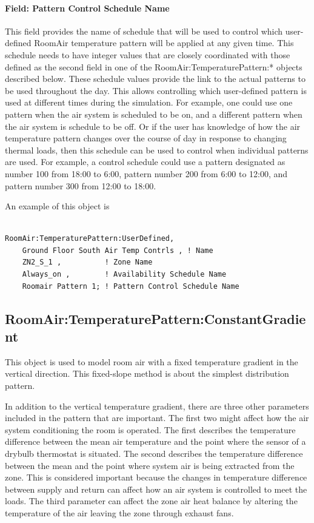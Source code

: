 \paragraph{Field: Pattern Control Schedule Name}\label{field-pattern-control-schedule-name}

This field provides the name of schedule that will be used to control which user-defined RoomAir temperature pattern will be applied at any given time. This schedule needs to have integer values that are closely coordinated with those defined as the second field in one of the RoomAir:TemperaturePattern:* objects described below. These schedule values provide the link to the actual patterns to be used throughout the day. This allows controlling which user-defined pattern is used at different times during the simulation. For example, one could use one pattern when the air system is scheduled to be on, and a different pattern when the air system is schedule to be off. Or if the user has knowledge of how the air temperature pattern changes over the course of day in response to changing thermal loads, then this schedule can be used to control when individual patterns are used. For example, a control schedule could use a pattern designated as number 100 from 18:00 to 6:00, pattern number 200 from 6:00 to 12:00, and pattern number 300 from 12:00 to 18:00.

An example of this object is

\begin{lstlisting}

RoomAir:TemperaturePattern:UserDefined,
    Ground Floor South Air Temp Contrls , ! Name
    ZN2_S_1 ,          ! Zone Name
    Always_on ,        ! Availability Schedule Name
    Roomair Pattern 1; ! Pattern Control Schedule Name
\end{lstlisting}

\subsection{RoomAir:TemperaturePattern:ConstantGradient}\label{roomairtemperaturepatternconstantgradient}

This object is used to model room air with a fixed temperature gradient in the vertical direction. This fixed-slope method is about the simplest distribution pattern.

In addition to the vertical temperature gradient, there are three other parameters included in the pattern that are important. The first two might affect how the air system conditioning the room is operated. The first describes the temperature difference between the mean air temperature and the point where the sensor of a drybulb thermostat is situated. The second describes the temperature difference between the mean and the point where system air is being extracted from the zone. This is considered important because the changes in temperature difference between supply and return can affect how an air system is controlled to meet the loads. The third parameter can affect the zone air heat balance by altering the temperature of the air leaving the zone through exhaust fans.

